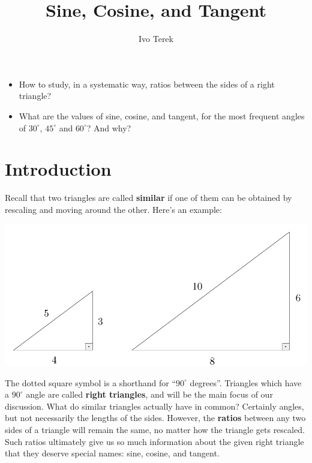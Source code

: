 \documentclass{ximera}
\author{Ivo Terek}
\title{Sine, Cosine, and Tangent}
\begin{document}
\begin{abstract}
  
\end{abstract}
\maketitle



\begin{motivatingQuestions}\begin{itemize}
\item How to study, in a systematic way, ratios between the sides of a right triangle?
\item What are the values of sine, cosine, and tangent, for the most frequent angles of $30^\circ$, $45^\circ$ and $60^\circ$? And why?
\end{itemize}\end{motivatingQuestions}



\section{Introduction}

Recall that two triangles are called {\bf similar} if one of them can be obtained by rescaling and moving around the other. Here's an example:

\begin{center}
  \includegraphics[scale=.3]{./figures/9-1-1-intro.png}
\end{center}

The dotted square symbol is a shorthand for ``$90^\circ$ degrees''. Triangles which have a $90^\circ$ angle are called {\bf right triangles}, and will be the main focus of our discussion. What do similar triangles actually have in common? Certainly angles, but not necessarily the lengths of the sides. However, the {\bf ratios} between any two sides of a triangle will remain the same, no matter how the triangle gets rescaled. Such ratios ultimately give us so much information about the given right triangle that they deserve special names: sine, cosine, and tangent.
\end{document}

